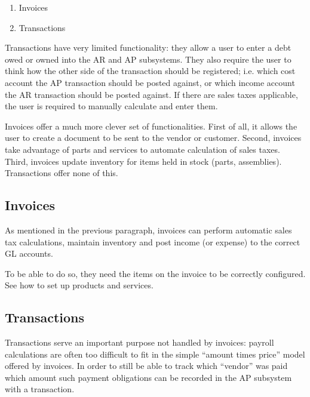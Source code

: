 \begin{enumerate}
\item Invoices
\item Transactions
\end{enumerate}

Transactions have very limited functionality: they allow a user to enter
a debt owed or owned into the AR and AP subsystems. They also require the
user to think how the other side of the transaction should be registered;
i.e. which cost account the AP transaction should be posted against, or
which income account the AR transaction should be posted against. If there
are sales taxes applicable, the user is required to manually calculate and
enter them.

Invoices offer a much more clever set of functionalities. First of all, it
allows the user to create a document to be sent to the vendor or \gls{customer}.
Second, invoices take advantage of parts and services
to automate calculation of sales taxes. Third, invoices update inventory
for items held in stock (parts, assemblies). Transactions offer none of this.

\subsection{Invoices}
\label{subsec-workflows-invoicing-manual-entry-invoices}


As mentioned in the previous paragraph, invoices can perform automatic
sales tax calculations, maintain inventory and post income (or expense)
to the correct GL accounts.

To be able to do so, they need the items on the invoice to be correctly
configured. See  how to set up products
and services.




\subsection{Transactions}
\label{subsec-workflows-invoicing-manual-entry-transactions}


Transactions serve an important purpose not handled by invoices: payroll
calculations are often too difficult to fit in the simple ``amount times price''
model offered by invoices. In order to still be able to track which ``vendor''
was paid which amount such payment obligations can be recorded in the AP subsystem
with a transaction.

